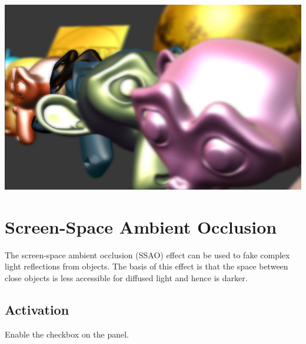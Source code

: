 \documentclass[a4paper,12pt,oneside]{sphinxmanual}
\begin{document}
{\hfill\includegraphics[width=1.000\linewidth]{dof.jpg}\hfill}

\begin{DUlineblock}{0em}
\item[] 
\end{DUlineblock}


\section{Screen-Space Ambient Occlusion}
\label{postprocessing_effects:index-2}\label{postprocessing_effects:ssao}\label{postprocessing_effects:id8}
The screen-space ambient occlusion (SSAO) effect can be used to fake complex light reflections from objects. The basis of this effect is that the space between close objects is less accessible for diffused light and hence is darker.


\subsection{Activation}
\label{postprocessing_effects:id9}
Enable the  checkbox on the  panel.
\end{document}
